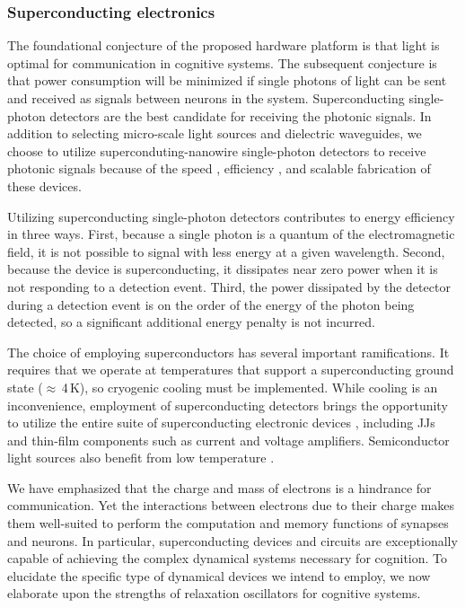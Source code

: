 \documentclass[twocolumn]{article}
\begin{document}
\subsubsection{Superconducting electronics}
The foundational conjecture of the proposed hardware platform is that light is optimal for communication in cognitive systems. The subsequent conjecture is that power consumption will be minimized if single photons of light can be sent and received as signals between neurons in the system. Superconducting single-photon detectors are the best candidate for receiving the photonic signals. In addition to selecting micro-scale light sources and dielectric waveguides, we choose to utilize superconduting-nanowire single-photon detectors \cite{gook2001,nata2012,liyo2013,mave2013} to receive photonic signals because of the speed \cite{yake2007}, efficiency \cite{mave2013}, and scalable fabrication \cite{buch2017} of these devices. 

Utilizing superconducting single-photon detectors contributes to energy efficiency in three ways. First, because a single photon is a quantum of the electromagnetic field, it is not possible to signal with less energy at a given wavelength. Second, because the device is superconducting, it dissipates near zero power when it is not responding to a detection event. Third, the power dissipated by the detector during a detection event is on the order of the energy of the photon being detected, so a significant additional energy penalty is not incurred.

The choice of employing superconductors has several important ramifications. It requires that we operate at temperatures that support a superconducting ground state ($\approx$\,4\,K), so cryogenic cooling must be implemented. While cooling is an inconvenience, employment of superconducting detectors brings the opportunity to utilize the entire suite of superconducting electronic devices \cite{ti1996,vatu1998,ka1999}, including JJs and thin-film components such as current \cite{mcbe2014,mcab2016} and voltage \cite{zhto2018} amplifiers. Semiconductor light sources also benefit from low temperature \cite{doro2017}. 

We have emphasized that the charge and mass of electrons is a hindrance for communication. Yet the interactions between electrons due to their charge makes them well-suited to perform the computation and memory functions of synapses and neurons. In particular, superconducting devices and circuits are exceptionally capable of achieving the complex dynamical systems necessary for cognition. To elucidate the specific type of dynamical devices we intend to employ, we now elaborate upon the strengths of relaxation oscillators for cognitive systems.
\end{document}
